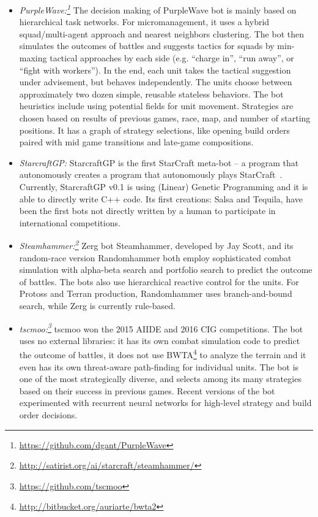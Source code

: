 \begin{itemize}
  \item {\em PurpleWave:\footnote{\url{https://github.com/dgant/PurpleWave}}} The decision making of PurpleWave bot is mainly based on hierarchical task networks. For micromanagement, it uses a hybrid squad/multi-agent approach and nearest neighbors clustering. The bot then simulates the outcomes of battles and suggests tactics for squads by min-maxing tactical approaches by each side (e.g. ``charge in'', ``run away'', or ``fight with workers''). In the end, each unit takes the tactical suggestion under advisement, but behaves independently. The units choose between approximately two dozen simple, reusable stateless behaviors. The bot heuristics include using potential fields for unit movement. Strategies are chosen based on results of previous games, race, map, and number of starting positions. It has a graph of strategy selections, like opening build orders paired with mid game transitions and late-game compositions.
  	
  \item {\em StarcraftGP:} StarcraftGP is the first StarCraft meta-bot -- a program that autonomously creates a program that autonomously plays StarCraft~\cite{garcia2015towards}. Currently, StarcraftGP v0.1 is using (Linear) Genetic Programming and it is able to directly write C++ code. Its first creations: Salsa and Tequila, have been the first bots not directly written by a human to participate in international competitions.

  \item {\em Steamhammer:\footnote{\url{http://satirist.org/ai/starcraft/steamhammer/}}} Zerg bot Steamhammer, developed by Jay Scott, and its random-race version Randomhammer both employ sophisticated combat simulation with alpha-beta search and portfolio search to predict the outcome of battles. The bots also use hierarchical reactive control for the units. For Protoss and Terran production, Randomhammer uses branch-and-bound search, while Zerg is currently rule-based.

  \item {\em tscmoo:\footnote{\url{https://github.com/tscmoo}}} tscmoo won the 2015 AIIDE and 2016 CIG competitions. The bot uses no external libraries: it has its own combat simulation code to predict the outcome of battles, it does not use BWTA\footnote{\url{http://bitbucket.org/auriarte/bwta2}} to analyze the terrain and it even has its own threat-aware path-finding for individual units. The bot is one of the most strategically diverse, and selects among its many strategies based on their success in previous games. Recent versions of the bot experimented with recurrent neural networks for high-level strategy and build order decisions.


\end{itemize}
